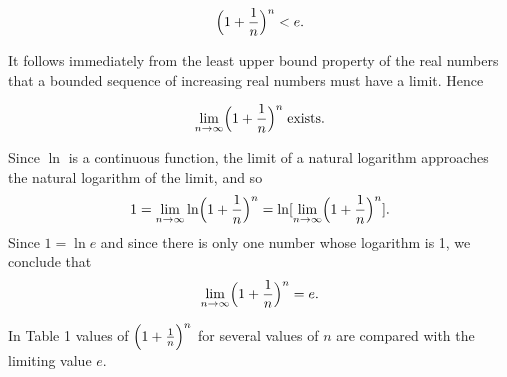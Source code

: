 $$
\Bigl(1 + \frac{1}{n} \Bigr)^{n} < e.
$$

\noindent It follows immediately from the least upper bound property of the real numbers that a bounded sequence of increasing real numbers must have a limit. Hence 

$$
\lim_{n \rightarrow \infty} \Bigl(1 + \frac{1}{n} \Bigr)^{n}\;\mbox{exists}.
$$

\noindent Since $\ln$ is a continuous function, the limit of a natural logarithm approaches the natural logarithm of the limit, and so
$$
1 = \lim_{n \rightarrow \infty} \ln \Bigl( 1 +\frac{1}{n} \Bigr)^n = \ln 
[\lim_{n \rightarrow \infty} \Bigl(1 + \frac{1}{n} \Bigr)^n ].
$$
\noindent Since $1 = \ln e$ and since there is only one number whose logarithm is 1, we conclude that
$$
\lim_{n \rightarrow \infty} \Bigl( 1 + \frac{1}{n} \Bigr)^n = e.  
$$

\noindent In Table 1 values of $\Bigl( 1 + \frac{1}{n} \Bigr)^n$ for several values of $n$ are compared with the limiting value $e$.

